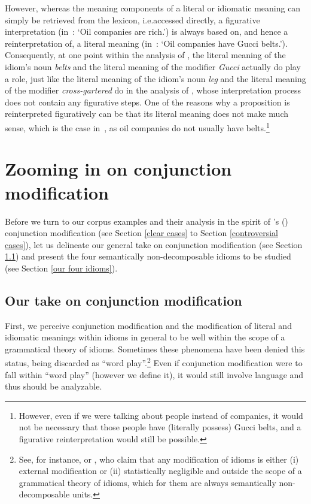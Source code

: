 \documentclass[output=paper]{langsci/langscibook}
\begin{document}
\begin{sloppypar}
  However, whereas the meaning components of a literal or idiomatic
  meaning can simply be retrieved from the lexicon, i.e.\@ accessed
  directly, a figurative interpretation (\mbox{in :} `Oil companies are rich.') is always based
  on, and hence a reinterpretation of, a literal meaning (\mbox{in
    :} `Oil companies have Gucci
  belts.'). Consequently, at one point within the analysis of
  , the literal meaning of the idiom's noun
  \textit{belts} and the literal meaning of the modifier
  \textit{Gucci} actually do play a role, just like the literal
  meaning of the idiom's noun \textit{leg} and the literal meaning of
  the modifier \textit{cross-gartered} do in the analysis of
  , whose interpretation process
  does not contain any figurative steps. One of the reasons why a
  propo\-sition is reinterpreted figuratively can be that its literal
  meaning does not make much sense, which is the case \mbox{in
    }, as oil companies do not
  usually have belts.\footnote{However, even if we were talking about
    people instead of companies, it would not be necessary that those
    people have (literally possess) Gucci belts, and a figurative
    reinterpretation would still be possible.}
\end{sloppypar}


\section{Zooming in on conjunction modification} \label{Zoom ConjMod}

Before we turn to our corpus examples and their analysis in the spirit of \citeauthor{ernst81}'s (\citeyear{ernst81}) conjunction modification (see Section \ref{clear cases} to Section \ref{controversial cases}), let us delineate our general take on conjunction modification (see Section \ref{our take}) and present the four semantically non-decomposable idioms to be studied (see Section \ref{our four idioms}).



\subsection{Our take on conjunction modification} \label{our take}

First, we perceive conjunction modification and the modification of literal and idiomatic meanings within idioms in general to be well within the scope of a grammatical theory of idioms. Sometimes these phenomena have been denied this status, being discarded as ``word play''.\footnote{See, for instance, \cite{schenk95} or \cite{nicolas95}, who claim that any modification of idioms is either (i) external modification or (ii) statistically negligible and outside the scope of a grammatical theory of idioms, which for them are always semantically non-decomposable units.}
Even if conjunction modification were to fall within ``word play'' (however we define it), it would still involve language and thus should be analyzable.
\end{document}
